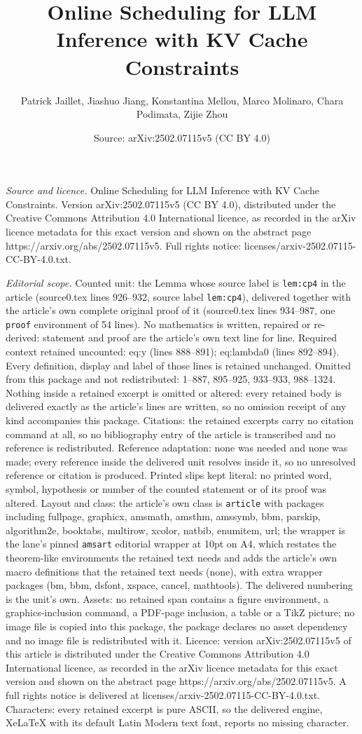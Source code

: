 \documentclass[10pt,a4paper]{amsart}
\title[Online Scheduling for LLM Inference with KV Cache Constraint]{Online Scheduling for LLM Inference with KV Cache Constraints}
\author{Patrick Jaillet, Jiashuo Jiang, Konstantina Mellou, Marco Molinaro, Chara Podimata, Zijie Zhou}
\date{Source: arXiv:2502.07115v5 (CC BY 4.0)}
\begin{document}
\maketitle

\noindent\emph{Source and licence.} Online Scheduling for LLM Inference with KV Cache Constraints. Version arXiv:2502.07115v5 (CC BY 4.0), distributed under the Creative Commons Attribution 4.0 International licence, as recorded in the arXiv licence metadata for this exact version and shown on the abstract page https://arxiv.org/abs/2502.07115v5. Full rights notice: licenses/arxiv-2502.07115-CC-BY-4.0.txt.\par\smallskip

\noindent\textit{Editorial scope.} Counted unit: the Lemma whose source label is \texttt{lem:cp4} in the article (source0.tex lines 926--932, source label \texttt{lem:cp4}), delivered together with the article's own complete original proof of it (source0.tex lines 934--987, one \texttt{proof} environment of 54 lines). No mathematics is written, repaired or re-derived: statement and proof are the article's own text line for line. Required context retained uncounted: eq:y (lines 888--891); eq:lambda0 (lines 892--894). Every definition, display and label of those lines is retained unchanged. Omitted from this package and not redistributed: 1--887, 895--925, 933--933, 988--1324. Nothing inside a retained excerpt is omitted or altered: every retained body is delivered exactly as the article's lines are written, so no omission receipt of any kind accompanies this package. Citations: the retained excerpts carry no citation command at all, so no bibliography entry of the article is transcribed and no reference is redistributed. Reference adaptation: none was needed and none was made; every reference inside the delivered unit resolves inside it, so no unresolved reference or citation is produced. Printed slips kept literal: no printed word, symbol, hypothesis or number of the counted statement or of its proof was altered. Layout and class: the article's own class is \texttt{article} with packages including fullpage, graphicx, amsmath, amsthm, amssymb, bbm, parskip, algorithm2e, booktabs, multirow, xcolor, natbib, enumitem, url; the wrapper is the lane's pinned \texttt{amsart} editorial wrapper at 10pt on A4, which restates the theorem-like environments the retained text needs and adds the article's own macro definitions that the retained text needs (none), with extra wrapper packages (bm, bbm, dsfont, xspace, cancel, mathtools). The delivered numbering is the unit's own. Assets: no retained span contains a figure environment, a graphics-inclusion command, a PDF-page inclusion, a table or a TikZ picture; no image file is copied into this package, the package declares no asset dependency and no image file is redistributed with it. Licence: version arXiv:2502.07115v5 of this article is distributed under the Creative Commons Attribution 4.0 International licence, as recorded in the arXiv licence metadata for this exact version and shown on the abstract page https://arxiv.org/abs/2502.07115v5. A full rights notice is delivered at licenses/arxiv-2502.07115-CC-BY-4.0.txt. Characters: every retained excerpt is pure ASCII, so the delivered engine, XeLaTeX with its default Latin Modern text font, reports no missing character.
\end{document}
